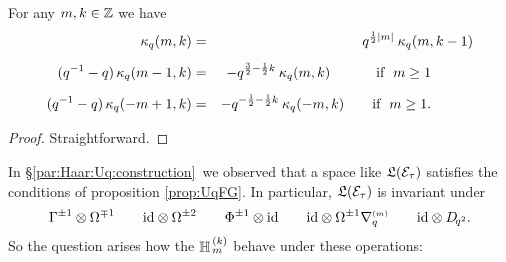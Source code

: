 \begin{lemma} \label{lemma:kq:formulas}
For any\/ $m,k\in\mathbb{Z}$ we have
\begin{eqnarray}
\kq(m,k)                 &=&        q^{\frac{1}{2}|m|} \: \kq(m,k-1)
       \label{eq:kq:formula1} \\
(q^{-1}-q)\, \kq(m-1,k)  &\vertXL=& -q^{\frac{3}{2} -\frac{1}{2}k}\: \kq(m,k)
                       \hspace{3em}\;   {\rm if}\;\; m\geq 1  \hspace{3em}
       \label{eq:kq:formula2}\\
(q^{-1}-q)\, \kq(-m+1,k) &\vertXL=& -q^{-\frac{1}{2} -\frac{1}{2}k}\: \kq(-m,k)
                       \hspace{2em}     {\rm if}\;\; m\geq 1.  \hspace{3em}
       \label{eq:kq:formula3}
\end{eqnarray}
\end{lemma}
\begin{proof}
Straightforward.
\end{proof}
\vspace{1ex}

In \S \ref{par:Haar:Uq:construction}\ we observed that a space like $\mathfrak{L}(\mathcal E_\tau)$
satisfies the conditions of proposition \ref{prop:UqFG}\@.
In particular, $\mathfrak{L}(\mathcal E_\tau)$ is invariant under
$$\Gamma^{\pm 1} \otimes \Omega^{\mp 1}   \hspace{2em}
\mbox{\rm id} \otimes \Omega^{\pm 2}                \hspace{2em}
\Phi^{\pm 1} \otimes \mbox{\rm id}                  \hspace{2em}
\mbox{\rm id} \otimes \Omega^{\pm 1} \nabla_q^{\scriptscriptstyle (m)}       \hspace{2em}
\mbox{\rm id} \otimes D_{\!q^2}. $$
So the question arises how the $\mathbb{H}_{\,m}^{\,(k)}$ behave under these operations:



